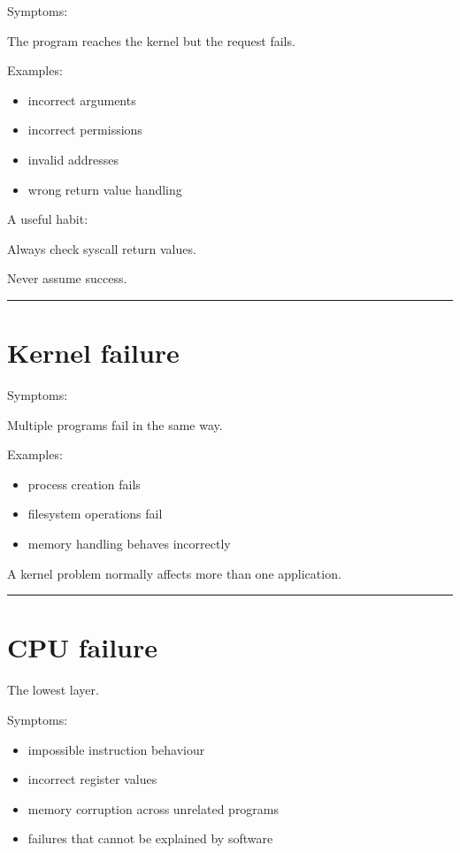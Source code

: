 \documentclass[
  oneside,
  openany]{book}
\providecommand{\tightlist}{%
  \setlength{\itemsep}{0pt}\setlength{\parskip}{0pt}}
\begin{document}
Symptoms:

The program reaches the kernel but the request fails.

Examples:

\begin{itemize}
\tightlist
\item
  incorrect arguments
\item
  incorrect permissions
\item
  invalid addresses
\item
  wrong return value handling
\end{itemize}

A useful habit:

Always check syscall return values.

Never assume success.

\begin{center}\rule{0.5\linewidth}{0.5pt}\end{center}

\hypertarget{kernel-failure}{%
\section{Kernel failure}\label{kernel-failure}}

Symptoms:

Multiple programs fail in the same way.

Examples:

\begin{itemize}
\tightlist
\item
  process creation fails
\item
  filesystem operations fail
\item
  memory handling behaves incorrectly
\end{itemize}

A kernel problem normally affects more than one application.

\begin{center}\rule{0.5\linewidth}{0.5pt}\end{center}

\hypertarget{cpu-failure}{%
\section{CPU failure}\label{cpu-failure}}

The lowest layer.

Symptoms:

\begin{itemize}
\tightlist
\item
  impossible instruction behaviour
\item
  incorrect register values
\item
  memory corruption across unrelated programs
\item
  failures that cannot be explained by software
\end{itemize}
\end{document}
